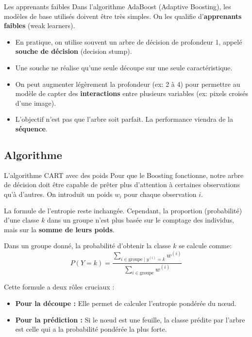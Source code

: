 \begin{frame}{Les apprenants faibles}
	Dans l'algorithme AdaBoost (Adaptive Boosting), les modèles de base utilisés doivent être très simples. On les qualifie d'\textbf{apprenants faibles} (weak learners).
	\begin{itemize}
		\item En pratique, on utilise souvent un arbre de décision de profondeur 1, appelé \textbf{souche de décision} (decision stump).
		\pause
		\item Une souche ne réalise qu'une seule découpe sur une seule caractéristique.
		\pause
		\item On peut augmenter légèrement la profondeur (ex: 2 à 4) pour permettre au modèle de capter des \textbf{interactions} entre plusieurs variables (ex: pixels croisés d'une image).
		\pause
		\item L'objectif n'est pas que l'arbre soit parfait. La performance viendra de la \textbf{séquence}.
	\end{itemize}
\end{frame}

\subsection[Algorithme]{Algorithme}

\begin{frame}{L'algorithme CART avec des poids}
	Pour que le Boosting fonctionne, notre arbre de décision doit être capable de prêter plus d'attention à certaines observations qu'à d'autres. On introduit un poids $w_i$ pour chaque observation $i$.
	
	\vspace{0.3cm}
	La formule de l'entropie reste inchangée. Cependant, la proportion (probabilité) d'une classe $k$ dans un groupe n'est plus basée sur le comptage des individus, mais sur la \textbf{somme de leurs poids}.
	
	\pause
	\vspace{0.3cm}
	
	Dans un groupe donné, la probabilité d'obtenir la classe $k$ se calcule comme:
	\begin{equation*}
		P(Y = k) = \frac{\sum_{i \in \text{groupe} \mid y^{(i)} = k} w^{(i)}}{\sum_{i \in \text{groupe}} w^{(i)}}
	\end{equation*}
	
	\pause
	
	Cette formule a deux rôles cruciaux :
	\begin{itemize}
		\item \textbf{Pour la découpe :} Elle permet de calculer l'entropie pondérée du nœud.
		\item \textbf{Pour la prédiction :} Si le nœud est une feuille, la classe prédite par l'arbre est celle qui a la probabilité pondérée la plus forte.
	\end{itemize}
\end{frame}

